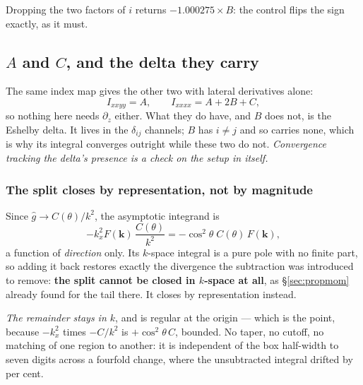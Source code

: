 \documentclass[11pt,a4paper]{article}
\begin{document}
Dropping the two factors of $i$ returns $-1.000275\times B$: the control flips the
sign exactly, as it must.

\subsection{\texorpdfstring{$A$ and $C$}{A and C}, and the delta they
carry}\label{sec:acmoment}

The same index map gives the other two with lateral derivatives alone:
\begin{equation}
  I_{xxyy} = A, \qquad I_{xxxx} = A + 2B + C,
\end{equation}
so nothing here needs $\partial_z$ either.  What they do have, and $B$ does not,
is the Eshelby delta.  It lives in the $\delta_{ij}$ channels; $B$ has $i\neq j$
and so carries none, which is why its integral converges outright while these
two do not.  \emph{Convergence tracking the delta's presence is a check on the
setup in itself.}

\subsubsection*{The split closes by representation, not by magnitude}

Since $\widehat{g}\to C(\theta)/k^2$, the asymptotic integrand is
\begin{equation}\label{eq:asymint}
  -k_x^2 F(\mathbf{k})\,\frac{C(\theta)}{k^2}
  = -\cos^2\!\theta\; C(\theta)\, F(\mathbf{k}),
\end{equation}
a function of \emph{direction} only.  Its $k$-space integral is a pure pole with
no finite part, so adding it back restores exactly the divergence the
subtraction was introduced to remove: \textbf{the split cannot be closed in
$k$-space at all}, as \S\ref{sec:propmom} already found for the tail there.  It
closes by representation instead.

\emph{The remainder stays in $k$}, and is regular at the origin --- which is the
point, because $-k_x^2$ times $-C/k^2$ is $+\cos^2\!\theta\,C$, bounded.  No
taper, no cutoff, no matching of one region to another: it is independent of the
box half-width to seven digits across a fourfold change, where the unsubtracted
integral drifted by per cent.
\end{document}

